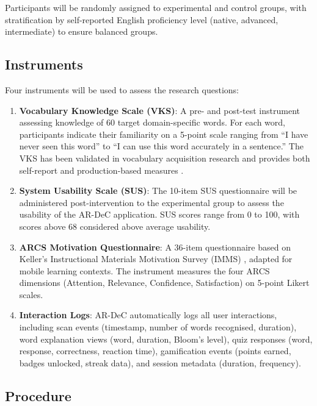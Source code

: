 Participants will be randomly assigned to experimental and control groups, with stratification by self-reported English proficiency level (native, advanced, intermediate) to ensure balanced groups.

\subsection{Instruments}
\label{subsec:instruments}

Four instruments will be used to assess the research questions:

\begin{enumerate}
    \item \textbf{Vocabulary Knowledge Scale (VKS)}: A pre- and post-test instrument assessing knowledge of 60 target domain-specific words. For each word, participants indicate their familiarity on a 5-point scale ranging from ``I have never seen this word'' to ``I can use this word accurately in a sentence.'' The VKS has been validated in vocabulary acquisition research and provides both self-report and production-based measures \cite{lan2015}.

    \item \textbf{System Usability Scale (SUS)}: The 10-item SUS questionnaire \cite{brooke1996} will be administered post-intervention to the experimental group to assess the usability of the AR-DeC application. SUS scores range from 0 to 100, with scores above 68 considered above average usability.

    \item \textbf{ARCS Motivation Questionnaire}: A 36-item questionnaire based on Keller's Instructional Materials Motivation Survey (IMMS) \cite{keller2010}, adapted for mobile learning contexts. The instrument measures the four ARCS dimensions (Attention, Relevance, Confidence, Satisfaction) on 5-point Likert scales.

    \item \textbf{Interaction Logs}: AR-DeC automatically logs all user interactions, including scan events (timestamp, number of words recognised, duration), word explanation views (word, duration, Bloom's level), quiz responses (word, response, correctness, reaction time), gamification events (points earned, badges unlocked, streak data), and session metadata (duration, frequency).
\end{enumerate}

\subsection{Procedure}
\label{subsec:procedure}

